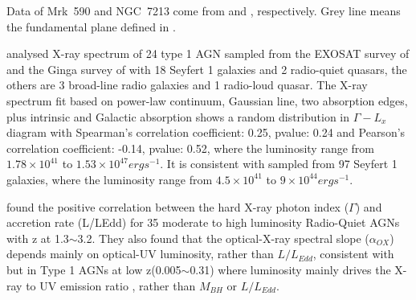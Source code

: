Data of Mrk~590 and NGC~7213 come from \citet{2016MNRAS.460..304K} and \citet{2011MNRAS.411..402B}, respectively. Grey line means the fundamental plane defined in \citet{2003MNRAS.345.1057M}.







\citet{1997MNRAS.286..513R} analysed X-ray spectrum of 24 type 1 AGN sampled from the EXOSAT survey of \citet{1989MNRAS.240..833T} and the Ginga survey of \citet{1994MNRAS.268..405N} with 18 Seyfert 1 galaxies and 2 radio-quiet quasars, the others are 3 broad-line radio galaxies and 1 radio-loud quasar. The X-ray spectrum fit based on power-law continuum, Gaussian line, two absorption edges, plus intrinsic and Galactic absorption shows a random distribution in $\Gamma-L_x$ diagram with Spearman's correlation coefficient: 0.25, pvalue: 0.24 and Pearson's correlation coefficient: -0.14, pvalue: 0.52, where the luminosity range from $1.78\times 10^{41}$ to $1.53\times 10^{47} erg s^{-1}$. It is consistent with \citet{2015AASP....5...79S} sampled from 97 Seyfert 1 galaxies, where the luminosity range from $4.5\times 10^{41}$ to $9\times 10^{44} erg s^{-1}$. 


\citet{2008ApJ...682...81S} found the positive correlation between the hard X-ray photon index ($\Gamma$) and accretion rate (L/LEdd) for 35 moderate to high luminosity Radio-Quiet AGNs with z at 1.3$\sim$3.2. They also found that the optical-X-ray spectral slope ($\alpha_{OX}$) depends mainly on optical-UV luminosity, rather than $L/L_{Edd}$, consistent with \citet{2012MNRAS.423..600S} but in Type 1 AGNs at low z(0.005$\sim$0.31) where luminosity mainly drives the X-ray to UV emission ratio , rather than $M_{BH}$ or $L/L_{Edd}$.







